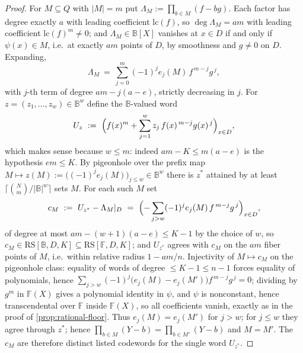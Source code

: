 \documentclass[11pt]{article}
\theoremstyle{definition}
\theoremstyle{remark}
\newcommand{\F}{\mathbb{F}}
\newcommand{\B}{\mathbb{B}}
\newcommand{\RS}{\mathrm{RS}}
\begin{document}
\begin{proof}
For $M\subseteq Q$ with $|M|=m$ put $\Lambda_M:=\prod_{b\in M}(f-bg)$. Each factor has degree exactly $a$ with leading coefficient $\mathrm{lc}(f)$, so $\deg\Lambda_M=am$ with leading coefficient $\mathrm{lc}(f)^m\ne0$; and $\Lambda_M\in\B[X]$ vanishes at $x\in D$ if and only if $\psi(x)\in M$, i.e.\ at exactly $am$ points of $D$, by smoothness and $g\ne0$ on $D$. Expanding,
\[
\Lambda_M\ =\ \sum_{j=0}^{m}(-1)^je_j(M)\,f^{\,m-j}g^{\,j},
\]
with $j$-th term of degree $am-j(a-e)$, strictly decreasing in $j$. For $z=(z_1,\dots,z_w)\in\B^w$ define the $\B$-valued word
\[
U_z\ :=\ \Bigl(f(x)^m+\sum_{j=1}^{w}z_j\,f(x)^{\,m-j}g(x)^{\,j}\Bigr)_{x\in D},
\]
which makes sense because $w\le m$: indeed $am-K\le m(a-e)$ is the hypothesis $em\le K$. By pigeonhole over the prefix map $M\mapsto z(M):=\bigl((-1)^je_j(M)\bigr)_{j\le w}\in\B^w$ there is $z^*$ attained by at least $\lceil\binom Nm/|\B|^w\rceil$ sets $M$. For each such $M$ set
\[
c_M\ :=\ U_{z^*}-\Lambda_M|_D\ =\ \Bigl(-\sum_{j>w}(-1)^je_j(M)\,f^{\,m-j}g^{\,j}\Bigr)_{x\in D},
\]
of degree at most $am-(w+1)(a-e)\le K-1$ by the choice of $w$, so $c_M\in\RS[\B,D,K]\subseteq\RS[\F,D,K]$; and $U_{z^*}$ agrees with $c_M$ on the $am$ fiber points of $M$, i.e.\ within relative radius $1-am/n$. Injectivity of $M\mapsto c_M$ on the pigeonhole class: equality of words of degree $\le K-1\le n-1$ forces equality of polynomials, hence $\sum_{j>w}(-1)^j\bigl(e_j(M)-e_j(M')\bigr)f^{\,m-j}g^{\,j}=0$; dividing by $g^m$ in $\F(X)$ gives a polynomial identity in $\psi$, and $\psi$ is nonconstant, hence transcendental over $\F$ inside $\F(X)$, so all coefficients vanish, exactly as in the proof of \cref{prop:rational-floor}. Thus $e_j(M)=e_j(M')$ for $j>w$; for $j\le w$ they agree through $z^*$; hence $\prod_{b\in M}(Y-b)=\prod_{b\in M'}(Y-b)$ and $M=M'$. The $c_M$ are therefore distinct listed codewords for the single word $U_{z^*}$.
\end{proof}
\end{document}
